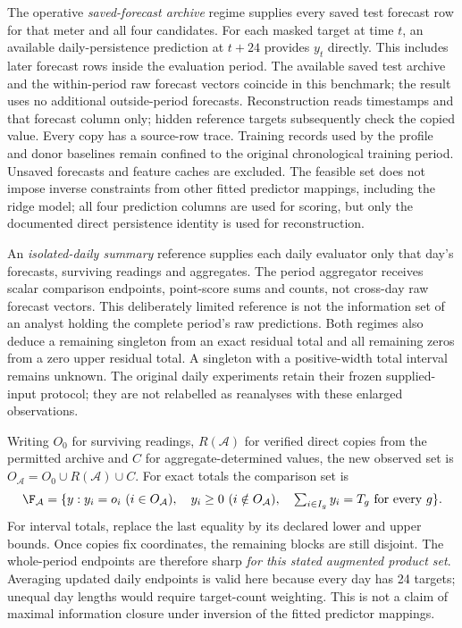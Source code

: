 The operative \emph{saved-forecast archive} regime supplies every saved
test forecast row for that meter and all four candidates. For each masked
target at time $t$, an available daily-persistence prediction at $t+24$
provides $y_t$ directly. This includes later forecast rows inside the
evaluation period. The available saved test archive and the within-period
raw forecast vectors coincide in this benchmark; the result uses no
additional outside-period forecasts. Reconstruction reads timestamps and that forecast
column only; hidden reference targets subsequently check the copied value.
Every copy has a source-row trace. Training records used by the profile
and donor baselines remain confined to the original chronological training
period. Unsaved forecasts and feature caches are excluded. The feasible set
does not impose inverse constraints from other fitted predictor mappings,
including the ridge model; all four prediction columns are used for scoring,
but only the documented direct persistence identity is used for reconstruction.

An \emph{isolated-daily summary} reference supplies each daily evaluator
only that day's forecasts, surviving readings and aggregates. The period
aggregator receives scalar comparison endpoints, point-score sums and
counts, not cross-day raw forecast vectors. This deliberately limited
reference is not the information set of an analyst holding the complete
period's raw predictions. Both regimes also deduce a remaining singleton
from an exact residual total and all remaining zeros from a zero upper
residual total. A singleton with a positive-width total interval remains
unknown. The original daily experiments retain their frozen supplied-input
protocol; they are not relabelled as reanalyses with these enlarged observations.

Writing $O_0$ for surviving readings, $R(\mathcal A)$ for verified direct
copies from the permitted archive and $C$ for aggregate-determined values,
the new observed set is $O_{\mathcal A}=O_0\cup R(\mathcal A)\cup C$.
For exact totals the comparison set is
\begin{equation}
 \F_{\mathcal A}=\{y:y_i=o_i\ (i\in O_{\mathcal A}),\quad
 y_i\geq0\ (i\notin O_{\mathcal A}),\quad
 \textstyle\sum_{i\in I_g}y_i=T_g\ \text{for every }g\}.
 \label{eq:archive-set}
\end{equation}
For interval totals, replace the last equality by its declared lower and
upper bounds. Once copies fix coordinates, the remaining blocks are still
disjoint. The whole-period endpoints are therefore sharp \emph{for this
stated augmented product set}. Averaging updated daily endpoints is valid
here because every day has 24 targets; unequal day lengths would require
target-count weighting. This is not a claim of maximal information closure
under inversion of the fitted predictor mappings.

